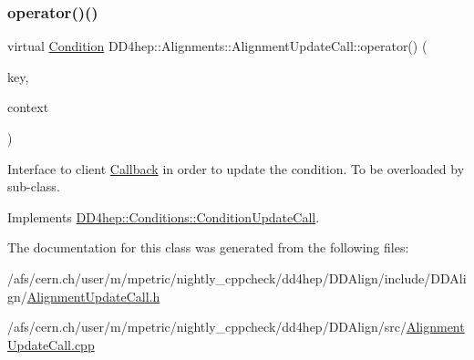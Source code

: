 \hypertarget{class_d_d4hep_1_1_alignments_1_1_alignment_update_call_a1180d2f8d62c0607b86c87853c7eeeb5}{}\label{class_d_d4hep_1_1_alignments_1_1_alignment_update_call_a1180d2f8d62c0607b86c87853c7eeeb5} 
\subsubsection{\texorpdfstring{operator()()}{operator()()}}
{\footnotesize\ttfamily virtual \hyperlink{class_d_d4hep_1_1_alignments_1_1_alignment_update_call_ac41c367dd7b7027a76d7b691223927fd}{Condition} D\+D4hep\+::\+Alignments\+::\+Alignment\+Update\+Call\+::operator() (\begin{DoxyParamCaption}\item[{const \hyperlink{class_d_d4hep_1_1_alignments_1_1_alignment_update_call_a3c759edb169218bd8bc3b1c15d8af2e0}{Condition\+Key} \&}]{key,  }\item[{const \hyperlink{class_d_d4hep_1_1_alignments_1_1_alignment_update_call_a648c995a6ab187911c79a687c8df0fa9}{Update\+Context} \&}]{context }\end{DoxyParamCaption})\hspace{0.3cm}{\ttfamily [pure virtual]}}



Interface to client \hyperlink{class_d_d4hep_1_1_callback}{Callback} in order to update the condition. To be overloaded by sub-\/class. 



Implements \hyperlink{class_d_d4hep_1_1_conditions_1_1_condition_update_call_adc561aca8c6bf851e0ee53f719b26a44}{D\+D4hep\+::\+Conditions\+::\+Condition\+Update\+Call}.



The documentation for this class was generated from the following files\+:\begin{DoxyCompactItemize}
\item 
/afs/cern.\+ch/user/m/mpetric/nightly\+\_\+cppcheck/dd4hep/\+D\+D\+Align/include/\+D\+D\+Align/\hyperlink{_alignment_update_call_8h}{Alignment\+Update\+Call.\+h}\item 
/afs/cern.\+ch/user/m/mpetric/nightly\+\_\+cppcheck/dd4hep/\+D\+D\+Align/src/\hyperlink{_alignment_update_call_8cpp}{Alignment\+Update\+Call.\+cpp}\end{DoxyCompactItemize}
